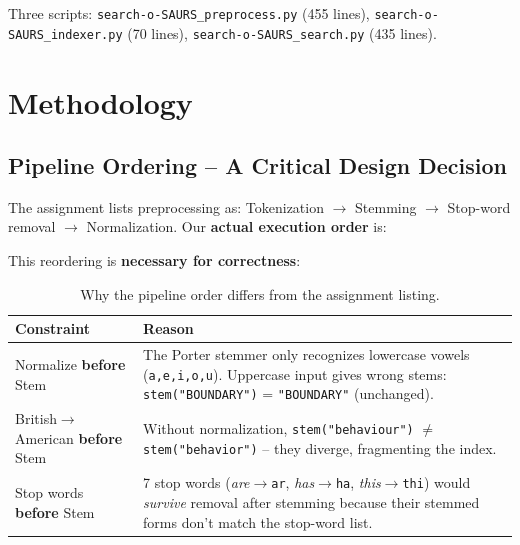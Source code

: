 \documentclass[12pt,a4paper]{article}
\begin{document}
Three scripts: \texttt{search-o-SAURS\_preprocess.py} (455 lines),
\texttt{search-o-SAURS\_indexer.py} (70 lines),
\texttt{search-o-SAURS\_search.py} (435 lines).

\section{Methodology}
\label{sec:methodology}

\subsection{Pipeline Ordering -- A Critical Design Decision}
\label{sec:pipeline_order}

The assignment lists preprocessing as: Tokenization $\to$ Stemming $\to$
Stop-word removal $\to$ Normalization.  Our \textbf{actual execution order} is:

\begin{center}
\end{center}

This reordering is \textbf{necessary for correctness}:

\begin{table}[H]
\centering\small
\caption{Why the pipeline order differs from the assignment listing.}
\label{tab:order}
\begin{tabular}{@{}p{4.5cm} p{8.5cm}@{}}
\toprule
\textbf{Constraint} & \textbf{Reason} \\
\midrule
Normalize \textbf{before} Stem &
The Porter stemmer only recognizes lowercase vowels (\texttt{a,e,i,o,u}).
Uppercase input gives wrong stems: \texttt{stem("BOUNDARY")} = \texttt{"BOUNDARY"} (unchanged). \\[3pt]
British$\to$American \textbf{before} Stem &
Without normalization, \texttt{stem("behaviour")} $\neq$ \texttt{stem("behavior")} -- they diverge, fragmenting the index. \\[3pt]
Stop words \textbf{before} Stem &
7 stop words (\textit{are}$\to$\texttt{ar}, \textit{has}$\to$\texttt{ha},
\textit{this}$\to$\texttt{thi}) would \textit{survive} removal after stemming because their stemmed forms don't match the stop-word list. \\
\bottomrule
\end{tabular}
\end{table}
\end{document}
